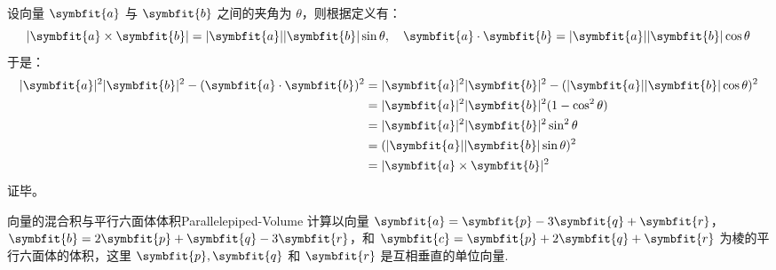 \begin{myproof}
    设向量 $\symbfit{a}$ 与 $\symbfit{b}$ 之间的夹角为 $\theta$，则根据定义有：
    \begin{equation}
        |\symbfit{a} \times \symbfit{b}| = |\symbfit{a}| |\symbfit{b}| \sin \theta, \quad \symbfit{a} \cdot \symbfit{b} = |\symbfit{a}| |\symbfit{b}| \cos \theta
    \end{equation}
    于是：
    \begin{equation}
        \begin{aligned}
            |\symbfit{a}|^2 |\symbfit{b}|^2 - (\symbfit{a} \cdot \symbfit{b})^2 & = |\symbfit{a}|^2 |\symbfit{b}|^2 - (|\symbfit{a}| |\symbfit{b}| \cos \theta)^2 \\
                                                                                & = |\symbfit{a}|^2 |\symbfit{b}|^2 (1 - \cos^2 \theta)                           \\
                                                                                & = |\symbfit{a}|^2 |\symbfit{b}|^2 \sin^2 \theta                                 \\
                                                                                & = (|\symbfit{a}| |\symbfit{b}| \sin \theta)^2                                   \\
                                                                                & = |\symbfit{a} \times \symbfit{b}|^2
        \end{aligned}
    \end{equation}
    证毕。
\end{myproof}


\begin{problem}{向量的混合积与平行六面体体积}{Parallelepiped-Volume}
    计算以向量 $\symbfit{a} = \symbfit{p} - 3\symbfit{q} + \symbfit{r}$，$\symbfit{b} = 2\symbfit{p} + \symbfit{q} - 3\symbfit{r}$，和 $\symbfit{c} = \symbfit{p} + 2\symbfit{q} + \symbfit{r}$ 为棱的平行六面体的体积，这里 $\symbfit{p}, \symbfit{q}$ 和 $\symbfit{r}$ 是互相垂直的单位向量.
\end{problem}

